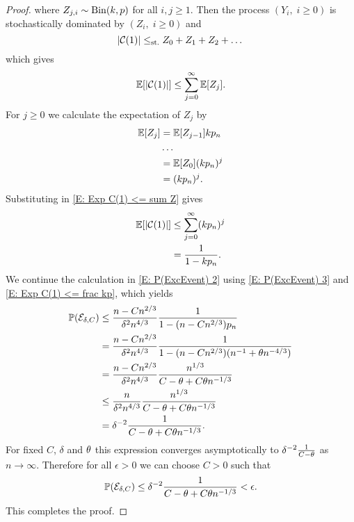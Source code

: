 \begin{proof}
	where $Z_{j,i} \sim\operatorname*{Bin}(k,p)$ for all $i,j \geq 1$.
	Then the process $(Y_i, \; i\geq 0)$ is stochastically dominated by 
	$(Z_i, \; i\geq 0)$ and
	\begin{equation}
	|\mathcal{C}(1)| \leq_{\text{st.}} Z_0 + Z_1 + Z_2 + \dots
	\end{equation}
	which gives
	\begin{equation} \label{E: Exp C(1) <= sum Z}
		\mathbb{E}[|\mathcal{C}(1)|] \leq \sum_{j=0}^{\infty}\mathbb{E}[Z_j].
	\end{equation}	
	For $j\geq0$ we calculate the expectation of $Z_j$ by
	\begin{equation}
	\begin{aligned}
	\mathbb{E}[Z_j] 
	&= \mathbb{E}[Z_{j-1}]k p_n \\
	&\dots \\
	&= \mathbb{E}[Z_0](kp_n)^j \\
	&= (kp_n)^j.
	\end{aligned}		
	\end{equation}
	Substituting in \eqref{E: Exp C(1) <= sum Z} gives
	\begin{equation} \label{E: Exp C(1) <= frac kp}
	\begin{aligned}
	\mathbb{E}[|\mathcal{C}(1)|] 
	&\leq \sum_{j=0}^{\infty} (k p_n)^j \\
	&= \frac{1}{1- kp_n}.
	\end{aligned}		
	\end{equation}
	We continue the calculation in \eqref{E: P(ExcEvent) 2} using \eqref{E: P(ExcEvent) 3} and \eqref{E: Exp C(1) <= frac kp},
	which yields
	\begin{equation}
	\begin{aligned}
	\mathbb{P}(\mathcal{E}_{\delta, C}) 
	&\leq \frac{n-Cn^{2 / 3}}{\delta^2 n^{4 / 3}} \frac{1}{1-(n-Cn^{2 / 3}) p_n} \\
	&= \frac{n-Cn^{2 / 3}}{\delta^2 n^{4 / 3}} \frac{1}{1-(n-Cn^{2 / 3})(n^{-1} + \theta n^{-4 / 3})} \\
	&= \frac{n-Cn^{2 / 3}}{\delta^2 n^{4 / 3}} \frac{n^{1 / 3}}{C-\theta+C\theta n^{-1 / 3}} \\
	&\leq \frac{n}{\delta^2 n^{4 / 3}} \frac{n^{1 / 3}}{C-\theta+C\theta n^{-1 / 3}} \\
	&= \delta^{-2} \frac{1}{C-\theta+C\theta n^{-1 / 3}}.
	\end{aligned}
	\end{equation}
	For fixed $C$, $\delta$ and $\theta$
	this expression converges asymptotically to $\delta^{-2} \frac{1}{C-\theta}$ as $n \rightarrow \infty$.
	Therefore for all $\epsilon>0$ we can choose $C>0$ such that
	\begin{equation}
		\mathbb{P}(\mathcal{E}_{\delta, C}) \leq \delta^{-2} \frac{1}{C-\theta+C\theta n^{-1 / 3}} < \epsilon.
	\end{equation}
	This completes the proof.
\end{proof}

